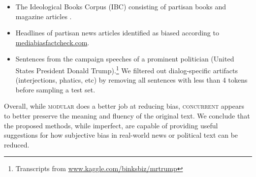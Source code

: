 \vspace*{-4pt}
\begin{itemize}
\itemsep 1pt
\item The Ideological Books Corpus (IBC) consisting of partisan books and magazine articles \cite{sim2013measuring,iyyer2014political}. 
\vspace*{-4pt}
\item Headlines of partisan news articles identified as biased according to \url{mediabiasfactcheck.com}.
\vspace*{-4pt}
\item Sentences from the campaign speeches of a prominent politician (United States President Donald Trump).\footnote{Transcripts from \url{www.kaggle.com/binksbiz/mrtrump}}  We filtered out dialog-specific artifacts (interjections, phatics, etc) by removing all sentences with less than 4 tokens before sampling a test set. 
\end{itemize}

Overall, while \textsc{modular} does a better job at reducing bias, \textsc{concurrent} appears to better preserve the meaning and fluency of the original text. We conclude that the proposed methods, while imperfect, are capable of providing useful suggestions for how subjective bias in real-world news or political text can be reduced. 



